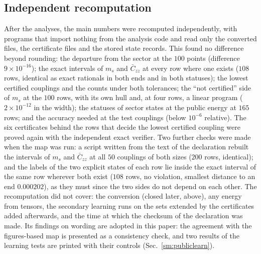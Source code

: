 \documentclass[aps,prx,onecolumn,10pt,nofootinbib,longbibliography,floatfix]{revtex4-2}
\theoremstyle{remark}
\newcommand{\ms}{m_s}
\newcommand{\Czz}{\bar C_{zz}}
\begin{document}
\subsection{Independent recomputation}
\label{sm:public_audit}
After the analyses, the main numbers were recomputed independently, with programs that import nothing from the
analysis code and read only the converted files, the certificate files and the stored state records. This found
no difference beyond rounding: the departure from the sector at the $100$ points (difference $9\times10^{-16}$); the %
exact intervals of $\ms$ and $\Czz$ at every row where one exists ($108$ rows, identical as exact rationals in both %
ends and in both statuses); the lowest certified couplings and the counts under both tolerances; the ``not
certified'' side of $\ms$ at the $100$ rows, with its own hull and, at four rows, a linear program ($2\times10^{-12}$ %
in the width); the statuses of sector states at the public energy at $165$ rows; and the accuracy needed at the test %
couplings (below $10^{-6}$ relative). The six certificates behind the rows that decide the lowest certified coupling %
were proved again with the independent exact verifier. Two further checks were made when the map was run:
a script written from the text of the declaration rebuilt the intervals of $\ms$ and $\Czz$ at all $50$ couplings of %
both sizes ($200$ rows, identical); and the labels of the two explicit states of each row lie inside the exact %
interval of the same row wherever both exist ($108$ rows, no violation, smallest distance to an end $0.000202$), as %
they must since the two sides do not depend on each other. The recomputation did not cover: the conversion (closed
later, above), any energy from tensors, the secondary learning runs on the sets extended by the certificates added
afterwards, and the time at which the checksum of the
declaration was made. Its findings on wording are adopted in this paper: the agreement with the figures-based map is
presented as a consistency check, and two results of the learning tests are printed with their controls
(Sec.~\ref{sm:publiclearn}).
\end{document}
